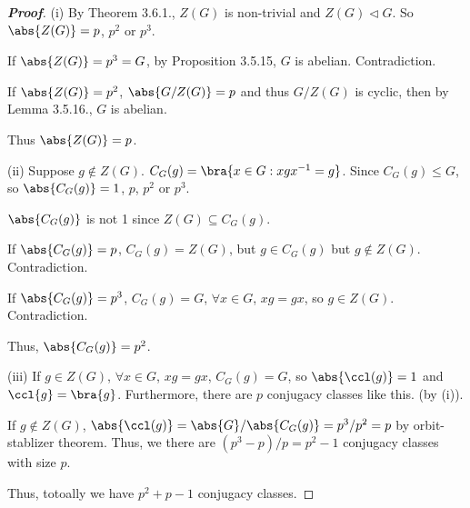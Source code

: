 \begin{proof}[\bf Proof]
\ben
\item [(i)] By Theorem 3.6.1., $Z(G)$ is non-trivial and $Z(G)\lhd G$. So $\abs{Z(G)} = p$, $p^2$ or $p^3$.

If $\abs{Z(G)} = p^3 = G$, by Proposition 3.5.15, $G$ is abelian. Contradiction.

If $\abs{Z(G)} = p^2$, $\abs{G/Z(G)}= p$ and thus $G/Z(G)$ is cyclic, then by Lemma 3.5.16., $G$ is abelian.

Thus $\abs{Z(G)} = p$.
\item [(ii)] Suppose $g\notin Z(G)$. $C_G(g) = \bra{x\in G: xgx^{-1} = g}$. Since $C_G(g) \leq G$, so $\abs{C_G(g)} = 1$, $p$, $p^2$ or $p^3$.

$\abs{C_G(g)}$ is not 1 since $Z(G)\subseteq C_G(g)$.

If $\abs{C_G(g)} = p$, $C_G(g) = Z(G)$, but $g\in C_G(g)$ but $g\notin Z(G)$. Contradiction.

If $\abs{C_G(g)} = p^3$, $C_G(g) = G$, $\forall x\in G$, $xg = gx$, so $g\in Z(G)$. Contradiction.

Thus, $\abs{C_G(g)} = p^2$.

\item [(iii)] If $g\in Z(G)$, $\forall x\in G$, $xg = gx$, $C_G(g) = G$, so $\abs{\ccl(g)}=1$ and $\ccl{g} = \bra{g}$. Furthermore, there are $p$ conjugacy classes like this. (by (i)).

If $g\notin Z(G)$, $\abs{\ccl(g)} = \abs{G}/\abs{C_G(g)} = p^3/p^2 = p$ by orbit-stablizer theorem. Thus, we there are $(p^3-p)/p = p^2 -1$ conjugacy classes with size $p$.

Thus, totoally we have $p^2 +p -1$ conjugacy classes.
\een
\end{proof}





